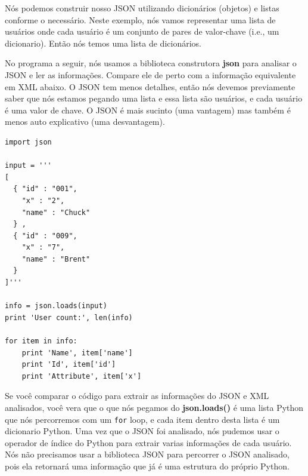 Nós podemos construir nosso JSON utilizando dicionários (objetos) e listas conforme
o necessário. Neste exemplo, nós vamos representar uma lista de usuários onde cada
usuário é um conjunto de pares de valor-chave (i.e., um dicionario). Então nós temos
uma lista de dicionários.

No programa a seguir, nós usamos a biblioteca construtora {\bf json} para analisar
o JSON e ler as informações. Compare ele de perto com a informação equivalente em XML
abaixo. O JSON tem menos detalhes, então nós devemos previamente saber que nós
estamos pegando uma lista e essa lista são usuários, e cada usuário é uma valor de 
chave. O JSON é mais sucinto (uma vantagem) mas também é menos auto explicativo 
(uma desvantagem).

\beforeverb
\begin{verbatim}
import json

input = '''
[
  { "id" : "001",
    "x" : "2",
    "name" : "Chuck"
  } ,
  { "id" : "009",
    "x" : "7",
    "name" : "Brent"
  } 
]'''

info = json.loads(input)
print 'User count:', len(info)

for item in info:
    print 'Name', item['name']
    print 'Id', item['id']
    print 'Attribute', item['x']
\end{verbatim}
\afterverb
%

Se você comparar o código para extrair as informações do JSON e XML analisados,
você vera que o que nós pegamos do {\bf json.loads()} é uma lista Python
que nós percorremos com um {\tt for} loop, e cada item dentro desta lista
é um dicionario Python. Uma vez que o JSON foi analisado, nós pudemos usar o
operador de índice do Python para extrair varias informações de cada usuário.
Nós não precisamos usar a biblioteca JSON para percorrer o JSON analisado, 
pois ela retornará uma informação que já é uma estrutura do próprio Python.

